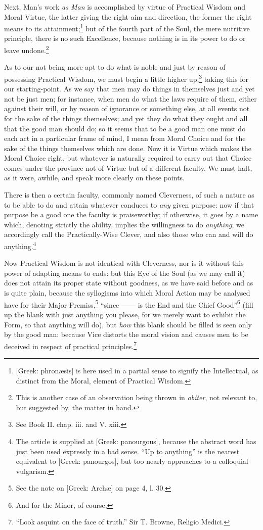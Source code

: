 Next, Man’s work \emph{as Man} is accomplished by virtue of Practical
Wisdom and Moral Virtue, the latter giving the right aim and direction, the
former the right means to its attainment;\footnote{[Greek: phronæsis] is here used in a partial sense to signify the Intellectual,
as distinct from the Moral, element of Practical Wisdom.}
but of the fourth part of the Soul, the mere nutritive principle, there is no
such Excellence, because nothing is in its power to do or leave
undone.\footnote{This is another case of an observation being thrown in \emph{obiter}, not
relevant to, but suggested by, the matter in hand.}

As to our not being more apt to do what is noble and just by reason of
possessing Practical Wisdom, we must begin a little higher
up,\footnote{See Book II. chap. iii. and V. xiii.}
taking this for our starting-point. As we say that men may do things in
themselves just and yet not be just men; for instance, when men do what the
laws require of them, either against their will, or by reason of ignorance or
something else, at all events not for the sake of the things themselves; and
yet they do what they ought and all that the good man should do; so it seems
that to be a good man one must do each act in a particular frame of mind, I
mean from Moral Choice and for the sake of the things themselves which are
done. Now it is Virtue which makes the Moral Choice right, but whatever is
naturally required to carry out that Choice comes under the province not of
Virtue but of a different faculty. We must halt, as it were, awhile, and speak
more clearly on these points.

There is then a certain faculty, commonly named Cleverness, of such a nature as
to be able to do and attain whatever conduces to \emph{any} given purpose: now
if that purpose be a good one the faculty is praiseworthy; if otherwise, it
goes by a name which, denoting strictly the ability, implies the willingness to
do \emph{anything}; we accordingly call the Practically-Wise Clever, and also
those who can and will do anything.\footnote{The article is supplied at [Greek: panourgous], because the abstract word has
just been used expressly in a bad sense. “Up to anything” is the
nearest equivalent to [Greek: panourgos], but too nearly approaches to a
colloquial vulgarism.}

Now Practical Wisdom is not identical with Cleverness, nor is it without this
power of adapting means to ends: but this Eye of the Soul (as we may call it)
does not attain its proper state without goodness, as we have said before and
as is quite plain, because the syllogisms into which Moral Action may be
analysed have for their Major Premiss,\footnote{See the note on [Greek: Archæ] on page 4, l. 30.}
“since —— is the End and the Chief Good”\footnote{And for the Minor, of course,}
(fill up the blank with just anything you please, for we merely want to exhibit
the Form, so that anything will do), but \emph{how} this blank should be filled
is seen only by the good man: because Vice distorts the moral vision and causes
men to be deceived in respect of practical
principles.\footnote{“Look asquint on the face of truth.” Sir T. Browne, Religio Medici.}

